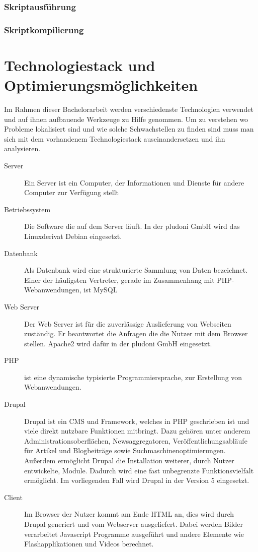 \subsubsection{Skriptausführung}
\subsubsection{Skriptkompilierung}

\section{Technologiestack und Optimierungsmöglichkeiten}
Im Rahmen dieser Bachelorarbeit werden verschiedenste Technologien verwendet und auf ihnen aufbauende Werkzeuge zu Hilfe genommen. Um zu verstehen wo Probleme lokalisiert sind und wie solche Schwachstellen zu finden sind muss man sich mit dem vorhandenem Technologiestack auseinandersetzen und ihn analysieren.
\begin{description}
  \item[Server] Ein Server ist ein Computer, der Informationen und Dienste für andere Computer zur Verfügung stellt
  \item[Betriebssystem] Die Software die auf dem Server läuft. In der pludoni GmbH wird das Linuxderivat Debian eingesetzt.
  \item[Datenbank] Als Datenbank wird eine strukturierte Sammlung von Daten bezeichnet. Einer der häufigsten Vertreter, gerade im Zusammenhang mit PHP-Webanwendungen, ist MySQL
  \item[Web Server] Der Web Server ist für die zuverlässige Auslieferung von Webseiten zuständig. Er beantwortet die Anfragen die die Nutzer mit dem Browser stellen. Apache2 wird dafür in der pludoni GmbH eingesetzt.
  \item[PHP] ist eine dynamische typisierte Programmiersprache, zur Erstellung von Webanwendungen. %
  \item[Drupal] Drupal ist ein CMS und Framework, welches in PHP geschrieben ist und viele direkt nutzbare Funktionen mitbringt. Dazu gehören unter anderem Administrationsoberflächen, Newsaggregatoren, Veröffentlichungsabläufe für Artikel und Blogbeiträge sowie Suchmaschinenoptimierungen. Außerdem ermöglicht Drupal die Installation weiterer, durch Nutzer entwickelte, Module. Dadurch wird eine fast unbegrenzte Funktionsvielfalt ermöglicht. Im vorliegenden Fall wird Drupal in der Version 5 eingesetzt.
  \item[Client] Im Browser der Nutzer kommt am Ende HTML an, dies wird durch Drupal generiert und vom Webserver ausgeliefert. Dabei werden Bilder verarbeitet Javascript Programme ausgeführt und andere Elemente wie Flashapplikationen und Videos berechnet. 
\end{description}

